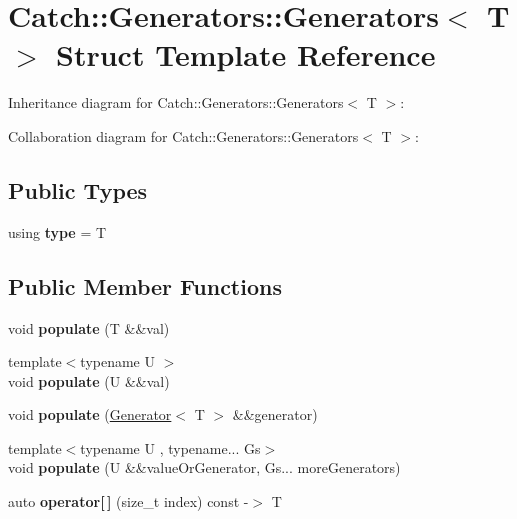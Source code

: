 \hypertarget{structCatch_1_1Generators_1_1Generators}{}\section{Catch\+:\+:Generators\+:\+:Generators$<$ T $>$ Struct Template Reference}
\label{structCatch_1_1Generators_1_1Generators}


Inheritance diagram for Catch\+:\+:Generators\+:\+:Generators$<$ T $>$\+:


Collaboration diagram for Catch\+:\+:Generators\+:\+:Generators$<$ T $>$\+:
\subsection*{Public Types}
\begin{DoxyCompactItemize}
\item 
\mbox{\label{structCatch_1_1Generators_1_1Generators_aab27f98a577b49532b2ca7556a84286b}} 
using {\bfseries type} = T
\end{DoxyCompactItemize}
\subsection*{Public Member Functions}
\begin{DoxyCompactItemize}
\item 
\mbox{\label{structCatch_1_1Generators_1_1Generators_ad708036fa5a9bf0cd1520ce111bc851d}} 
void {\bfseries populate} (T \&\&val)
\item 
\mbox{\label{structCatch_1_1Generators_1_1Generators_a8ff8b7dda734d1808b644fefc67f4c98}} 
{\footnotesize template$<$typename U $>$ }\\void {\bfseries populate} (U \&\&val)
\item 
\mbox{\label{structCatch_1_1Generators_1_1Generators_a2155cad48ab03c362483e200d957eefc}} 
void {\bfseries populate} (\hyperlink{classCatch_1_1Generators_1_1Generator}{Generator}$<$ T $>$ \&\&generator)
\item 
\mbox{\label{structCatch_1_1Generators_1_1Generators_a4b9680ee28e48e4dc4c4538b5510e649}} 
{\footnotesize template$<$typename U , typename... Gs$>$ }\\void {\bfseries populate} (U \&\&value\+Or\+Generator, Gs... more\+Generators)
\item 
\mbox{\label{structCatch_1_1Generators_1_1Generators_a1812ebb7d0146d63e3a005e93831afa2}} 
auto {\bfseries operator\mbox{[}$\,$\mbox{]}} (size\+\_\+t index) const -\/$>$ T
\end{DoxyCompactItemize}
